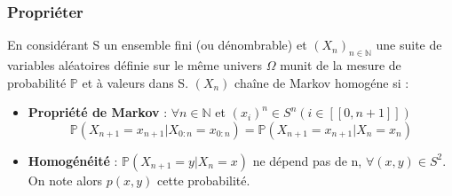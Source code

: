 \begin{frame}
    \frametitle{Propriéter}

        En considérant S un ensemble fini (ou dénombrable) et $(X_n)_{n \in \mathbb{N}}$ une suite de variables aléatoires définie sur le même univers $\Omega$ munit de la mesure de probabilité $\mathbb{P}$ et à valeurs dans S. $(X_n)$ chaîne de Markov homogéne si :

        \begin{itemize}
            \item \textbf{Propriété de Markov} : $\forall n \in \mathbb{N}$ et $(x_i)^n \in S^n (i \in [[0, n+1]])$ \\
            $$ \mathbb{P}(X_{n+1} = x_{n+1} | X_{0:n} = x_{0:n}) = \mathbb{P}(X_{n+1} = x_{n+1} | X_n = x_n) $$
            \item \textbf{Homogénéité} : $\mathbb{P}(X_{n+1} = y | X_n = x)$ ne dépend pas de n, $\forall (x, y) \in S^2$. On note alors $p(x, y)$ cette probabilité.
        \end{itemize}
\end{frame}
